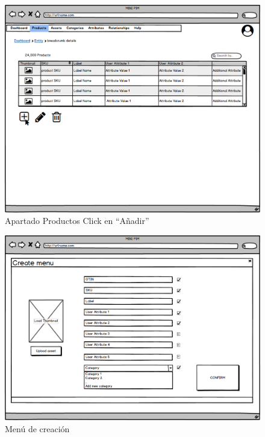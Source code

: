 \begin{figure}[H]
    \includegraphics[width=1\linewidth]{mockups/RF2.1_boceto1.png}
    \caption{Apartado Productos Click en “Añadir”}
   \end{figure}
\vspace{1.0cm}

\begin{figure}[H]
    \includegraphics[width=1\linewidth]{mockups/RF2.1_bocetoCreacion.png}
    \caption{Menú de creación}
   \end{figure}
\vspace{1.0cm}

\newpage %